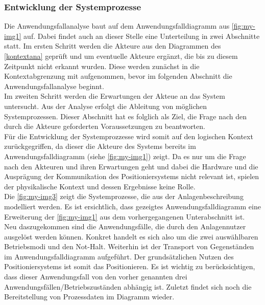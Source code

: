 \documentclass[../../../Bachelorarbeit.tex]{subfiles}
\begin{document}
\subsubsection{Entwicklung der Systemprozesse}
Die Anwendungsfallanalyse baut auf dem Anwendungsfalldiagramm aus \autoref{fig:my-img1} auf. Dabei findet auch an dieser Stelle eine Unterteilung in zwei Abschnitte statt. Im ersten Schritt werden die Akteure aus den Diagrammen des \autoref{kontextana} geprüft und um eventuelle Akteure ergänzt, die bis zu diesem Zeitpunkt nicht erkannt wurden. Diese werden zunächst in die Kontextabgrenzung mit aufgenommen, bevor im folgenden Abschnitt die Anwendungsfallanalyse beginnt.\\
Im zweiten Schritt werden die Erwartungen der Akteue an das System untersucht. Aus der Analyse erfolgt die Ableitung von möglichen Systemprozessen. Dieser Abschnitt hat es folglich als Ziel, die Frage nach den durch die Akteure geforderten Voraussetzungen zu beantworten.\\
Für die Entwicklung der Systemprozzesse wird somit auf den logischen Kontext zurückgegriffen, da dieser die Akteure des Systems bereits im Anwendungsfalldiagramm (siehe \autoref{fig:my-img1}) zeigt. Da es nur um die Frage nach den Akteuren und ihren Erwartungen geht und dabei die Hardware und die Ausprägung der Kommunikation des Positioniersystems nicht relevant ist, spielen der physikalische Kontext und dessen Ergebnisse keine Rolle.\\
Die \autoref{fig:my-img3} zeigt die Systemprozesse, die aus der Anlagenbeschreibung modelliert werden. Es ist ersichtlich, dass gezeigtes Anwendungsfalldiagramm eine Erweiterung der \autoref{fig:my-img1} aus dem vorhergegangenen Unterabschnitt ist.\\
Neu daszugekommen sind die Anwendungsfälle, die durch den Anlagennutzer ausgelöst werden können. Konkret handelt es sich also um die zwei auswählbaren Betriebsmodi und den Not-Halt. Weiterhin ist der Transport von Gegenständen im Anwendungsfalldiagramm aufgeführt. Der grundsätzlichen Nutzen des Positioniersystems ist somit das Positionieren. Es ist wichtig zu berücksichtigen, dass dieser Anwendungsfall von den vorher genannten drei Anwendungsfällen/Betriebszuständen abhängig ist. Zuletzt findet sich noch die Bereitstellung von Prozessdaten im Diagramm wieder.
\end{document}
